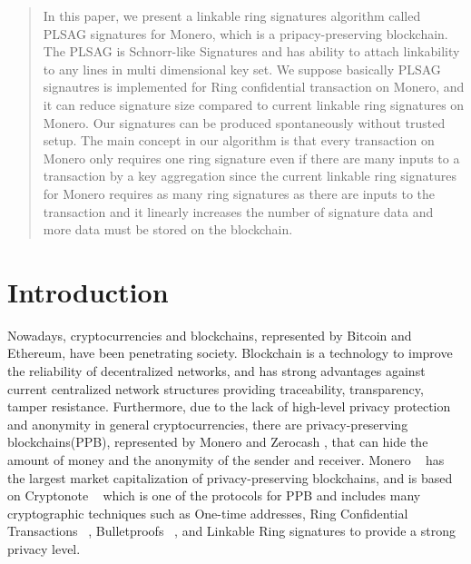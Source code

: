 \begin{abstract}
    In this paper, we present a linkable ring signatures algorithm called PLSAG signatures for Monero, which is a pripacy-preserving blockchain. The PLSAG is Schnorr-like Signatures and has ability to attach linkability to any lines in multi dimensional key set. We suppose basically PLSAG signautres is implemented for Ring confidential transaction on Monero, and it can reduce signature size compared to current linkable ring signatures on Monero. Our signatures can be produced spontaneously without trusted setup. The main concept in our algorithm is that every transaction on Monero only requires one ring signature even if there are many inputs to a transaction by a key aggregation since the current linkable ring signatures for Monero requires as many ring signatures as there are inputs to the transaction and it linearly increases the number of signature data and more data must be stored on the blockchain.
\end{abstract}


\section{Introduction}
    Nowadays, cryptocurrencies and blockchains, represented by Bitcoin and Ethereum, have been penetrating society. Blockchain is a technology to improve the reliability of decentralized networks, and has strong advantages against current centralized network structures providing traceability, transparency, tamper resistance. Furthermore, due to the lack of high-level privacy protection and anonymity in general cryptocurrencies, there are privacy-preserving blockchains(PPB), represented by Monero and Zerocash , that can hide the amount of money and the anonymity of the sender and receiver. Monero ~\cite{ztm-1} has the largest market capitalization of privacy-preserving blockchains, and is based on Cryptonote ~\cite{cryptoNote} which is one of the protocols for PPB and includes many cryptographic techniques such as One-time addresses, Ring Confidential Transactions ~\cite{RingCT-for-Monero}, Bulletproofs ~\cite{Bulletproofs}, and Linkable Ring signatures to provide a strong privacy level.
    
